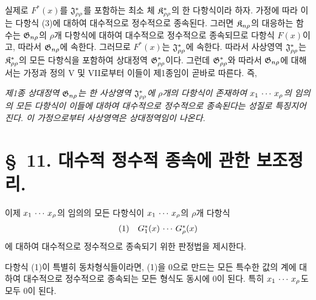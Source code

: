 실제로 $F^*(x)$를 $\mathfrak J^*_{\rho\rho}$를 포함하는 최소 체 $\mathfrak K^*_{\rho\rho}$의 한 다항식이라 하자. 가정에 따라 이는 다항식 (3)에 대하여 대수적으로 정수적으로 종속된다. 그러면 $\mathfrak K_{n\rho}$의 대응하는 함수는 $\mathfrak G_{n\rho}$의 $\rho$개 다항식에 대하여 대수적으로 정수적으로 종속되므로 다항식 $F(x)$이고, 따라서 $\mathfrak G_{n\rho}$에 속한다. 그러므로 $F^*(x)$는 $\mathfrak J^*_{\rho\rho}$에 속한다. 따라서 사상영역 $\mathfrak J^*_{\rho\rho}$는 $\mathfrak K^*_{\rho\rho}$의 모든 다항식을 포함하여 상대정역 $\mathfrak G^*_{\rho\rho}$이다. 그런데 $\mathfrak G^*_{\rho\rho}$와 따라서 $\mathfrak G_{n\rho}$에 대해서는 가정과 정의 V 및 VII로부터 이들이 제1종임이 곧바로 따른다. 즉,

\emph{제1종 상대정역 $\mathfrak G_{n\rho}$는 한 사상영역 $\mathfrak J^*_{\rho\rho}$에 $\rho$개의 다항식이 존재하여 $x_1\,\cdots\, x_\rho$의 임의의 모든 다항식이 이들에 대하여 대수적으로 정수적으로 종속된다는 성질로 특징지어진다. 이 가정으로부터 사상영역은 상대정역임이 나온다.}

\section*{\S\ 11. 대수적 정수적 종속에 관한 보조정리.}

이제 $x_1\,\cdots\, x_\rho$의 임의의 모든 다항식이 $x_1\,\cdots\, x_\rho$의 $\rho$개 다항식
\[
\begin{array}{@{}l@{\quad}c@{}}
(1)& G_1^*(x)\rcdots G_\rho^*(x)
\end{array}
\]
에 대하여 대수적으로 정수적으로 종속되기 위한 판정법을 제시한다.

다항식 (1)이 특별히 동차형식들이라면, (1)을 0으로 만드는 모든 특수한 값의 계에 대하여 대수적으로 정수적으로 종속되는 모든 형식도 동시에 0이 된다. 특히 $x_1\,\cdots\, x_\rho$도 모두 0이 된다.


